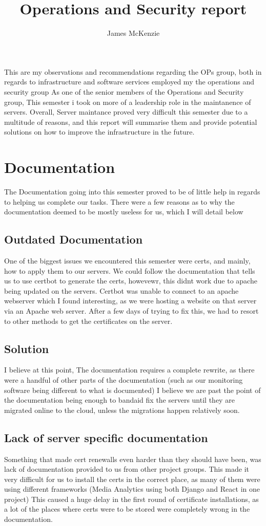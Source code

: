 \documentclass{article}
\begin{document}
\title{Operations and Security report}
\author{James McKenzie}

\maketitle
This are my observations and recommendations regarding the OPs group, both in regards to infrastructure and software services employed my the operations and
security group
\medskip
As one of the senior members of the Operations and Security group, This semester i took on more of a leadership role in the maintanence of servers. 
Overall, Server maintance proved very difficult this semester due to a multitude of reasons, and this report will summarise them and provide potential
solutions on how to improve the infrastructure in the future.

\section{Documentation}
The Documentation going into this semester proved to be of little help in regards to helping us complete our tasks. There were a few reasons as to why
the documentation deemed to be mostly useless for us, which I will detail below
\subsection{Outdated Documentation}
One of the biggest issues we encountered this semester were certs, and mainly, how to apply them to our servers. We could follow the documentation that tells us to 
use certbot to generate the certs, howevewr, this didnt work due to apache being updated on the servers. Certbot was unable to connect to an apache webserver which I found interesting, as we were hosting a website on that server via an Apache web server. After a few days of trying to fix this, we had to resort to other methods
to get the certificates on the server. 
\subsection*{Solution}
I believe at this point, The documentation requires a complete rewrite, as there were a handful of other parts of the documentation (such as our monitoring software 
being different to what is documented) 
I believe we are past the point of the documentation being enough to bandaid fix the servers until they are migrated online to the cloud, unless the migrations happen relatively soon.
\subsection{Lack of server specific documentation}
Something that made cert renewalls even harder than they should have been, was lack of documentation provided to us from other project groups. This made it very 
difficult for us to install the certs in the correct place, as many of them were using different frameworks (Media Analytics using both Django and React in one project) This caused a huge delay in the first round of certificate installations, as a lot of the places where certs were to be stored were completely wrong in the documentation. 
\end{document}
